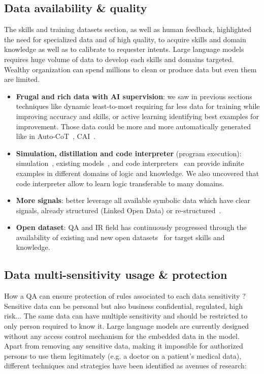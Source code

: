 \documentclass[acmsmall]{acmart}
\begin{document}
\subsection{Data availability \& quality}
The skills and training datasets section, as well as human feedback, highlighted the need for specialized data and of high quality, to acquire skills and domain knowledge as well as to calibrate to requester intents. Large language models requires huge volume of data to develop each skills and domains targeted. Wealthy organization can spend millions to clean or produce data but even them are limited.
\begin{itemize}
    \item \textbf{Frugal and rich data with AI supervision}: we saw in previous sections techniques like dynamic least-to-most requiring far less data for training while improving accuracy and skills, or active learning identifying best examples for improvement\citep{diaoActivePromptingChainofThought2023}. Those data could be more and more automatically generated like in Auto-CoT~\citep{zhangAutomaticChainThought2022}, CAI~\citep{baiConstitutionalAIHarmlessness2022}.
    \item \textbf{Simulation, distillation and code interpreter} (program execution): simulation~\citep{liuMindEyeGrounded2022, jacksonNaturalLanguageSimulations2022}, existing models~\citep{wahleCohesiveDistillationArchitecture2023}, and code interpreters~\citep{haluptzokLanguageModelsCan2022} can provide infinite examples in different domains of logic and knowledge. We also uncovered that code interpreter allow to learn logic transferable to many domains.
    \item \textbf{More signals}: better leverage all available symbolic data which have clear signals, already structured (Linked Open Data) or re-structured~\citep{yuanReStructuredPretraining2022}.
    \item \textbf{Open dataset}: QA and IR field has continuously progressed through the availability of existing and new open datasets~\citep{jerniteDataGovernanceAge2022} for target skills and knowledge.
\end{itemize}

\subsection{Data multi-sensitivity usage \& protection}\label{sec_data_sensitivity}
How a QA can ensure protection of rules associated to each data sensitivity ?
Sensitive data can be personal but also business confidential, regulated, high risk... The same data can have multiple sensitivity and should be restricted to only person required to know it. Large language models are currently designed without any access control mechanism for the embedded data in the model. Apart from removing any sensitive data, making it impossible for authorized persons to use them legitimately (e.g. a doctor on a patient's medical data), different techniques and strategies have been identified as avenues of research:
\end{document}
